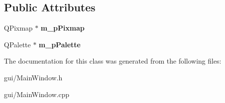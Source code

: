 \subsection*{Public Attributes}
\begin{DoxyCompactItemize}
\item 
\mbox{\label{classMainWindow_a0df1000428a75f4b5ca749b84f1f4a28}} 
Q\+Pixmap $\ast$ {\bfseries m\+\_\+p\+Pixmap}
\item 
\mbox{\label{classMainWindow_a4687ca985e01079dd109899fa997b5ef}} 
Q\+Palette $\ast$ {\bfseries m\+\_\+p\+Palette}
\end{DoxyCompactItemize}


The documentation for this class was generated from the following files\+:\begin{DoxyCompactItemize}
\item 
gui/Main\+Window.\+h\item 
gui/Main\+Window.\+cpp\end{DoxyCompactItemize}
